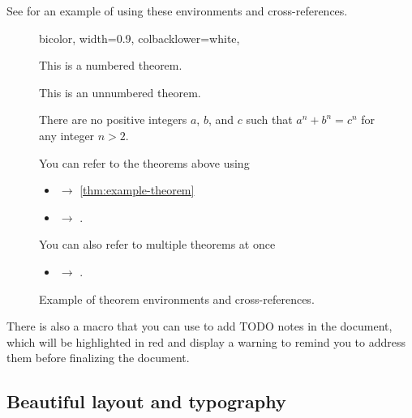 See  for an example of using these environments and cross-references.

\begin{figure}[!ht]
  \begin{tcblisting}{
    bicolor,
    width=0.9\textwidth,
    colbacklower=white,
  }
\begin{theorem} \label{thm:example-theorem}
  This is a numbered theorem.
\end{theorem}

\begin{theorem*}
  This is an unnumbered theorem.
\end{theorem*}

\begin{theorem} \label{thm:fermats-last-theorem}
  There are no positive integers $a$, $b$, and $c$ such that $a^n + b^n = c^n$ for any integer $n > 2$.
\end{theorem}

You can refer to the theorems above using
\begin{itemize}
  \item \custommacro{\cref} $\to$ \cref{thm:example-theorem}
  \item \custommacro{\Cref} $\to$ .
\end{itemize}
You can also refer to multiple theorems at once
\begin{itemize}
  \item \custommacro{\Cref*} $\to$ .
\end{itemize}
  \end{tcblisting}

  \caption{Example of theorem environments and cross-references.}
  \label{fig:theorem-environments-and-cross-references}
\end{figure}

There is also a \custommacro{\todo} macro that you can use to add TODO notes in the document, which will be highlighted in red and display a warning to remind you to address them before finalizing the document.

\subsection{Beautiful layout and typography}


